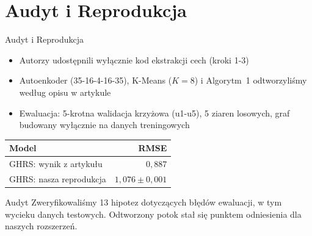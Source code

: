 \documentclass[red]{beamer}
\begin{document}
    \section{Audyt i Reprodukcja}
    \begin{frame}{Audyt i Reprodukcja}
        \small
        \begin{itemize}
            \item Autorzy udostępnili wyłącznie kod ekstrakcji cech (kroki 1-3)
            \item Autoenkoder (35-16-4-16-35), K-Means ($K = 8$) i Algorytm~1
                  odtworzyliśmy według opisu w artykule
            \item Ewaluacja: 5-krotna walidacja krzyżowa (u1-u5), 5 ziaren losowych,
                  graf budowany wyłącznie na danych treningowych
        \end{itemize}
        \begin{center}
            \begin{tabular}{lr}
                \toprule
                \textbf{Model} & \textbf{RMSE} \\
                \midrule
                GHRS: wynik z artykułu & $0{,}887$ \\
                GHRS: nasza reprodukcja & $1{,}076 \pm 0{,}001$ \\
                \bottomrule
            \end{tabular}
        \end{center}
        \begin{block}{Audyt}
            Zweryfikowaliśmy 13 hipotez dotyczących błędów ewaluacji, w tym wycieku
            danych testowych. Odtworzony potok stał się punktem odniesienia dla
            naszych rozszerzeń.
        \end{block}
    \end{frame}
\end{document}
